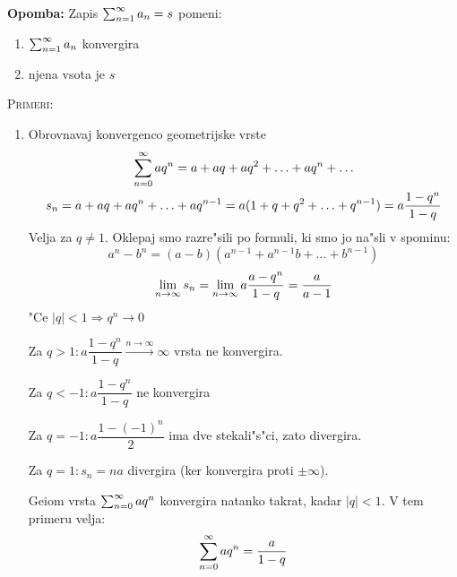 \textbf{Opomba:} Zapis $\sum_{n = 1}^{\infty} a_n = s$ pomeni:
\begin{enumerate}
	\item $\sum_{n = 1}^{\infty} a_n$ konvergira
	\item njena vsota je $s$
\end{enumerate}
\textsc{Primeri:}
\begin{enumerate}[1)]
	\item Obrovnavaj konvergenco geometrijske vrste
	\begin{gather*}
	\sum_{n = 0}^{\infty} a q^n = a + aq + aq^2 + \ldots + aq^n + \ldots \\
	s_n = a + aq + aq^n + \ldots + aq^{n-1} = a (1 + q + q^2 + \ldots + q^{n-1}) = a \dfrac{1-q^n}{1-q}
	\end{gather*}
	Velja za $q \neq 1$. Oklepaj smo razre"sili po formuli, ki smo jo na"sli v spominu:
	\begin{equation*}
	a^n - b^n = (a-b)(a^{n-1} + a^{n-1}b + \ldots + b^{n-1})
	\end{equation*}
	\begin{equation*}
	\lim_{n \rightarrow \infty} s_n = \lim_{n \rightarrow \infty} a\dfrac{a-q^n}{1-q} = \dfrac{a}{a-1}
	\end{equation*}
	"Ce $|q| < 1 \Rightarrow q^n \to 0$
	
	Za $q > 1: a\dfrac{1-q^n}{1-q} \stackrel{n \to \infty}{\longrightarrow} \infty$ vrsta ne konvergira.
	
	Za $q < -1: a\dfrac{1 - q^n}{1-q}$ ne konvergira
	
	Za $q = -1: a \dfrac{1 - (-1)^n}{2}$ ima dve stekali"s"ci, zato divergira.
	
	Za $q = 1: s_n = na$ divergira (ker konvergira proti $\pm \infty$).
	
	Geiom vrsta $\sum_{n = 0}^{\infty} aq^n$ konvergira natanko takrat, kadar $|q| < 1$. V tem primeru velja:
	\begin{equation*}
	\sum_{n = 0}^{\infty}aq^n = \dfrac{a}{1-q}
	\end{equation*}
	

\end{enumerate}
